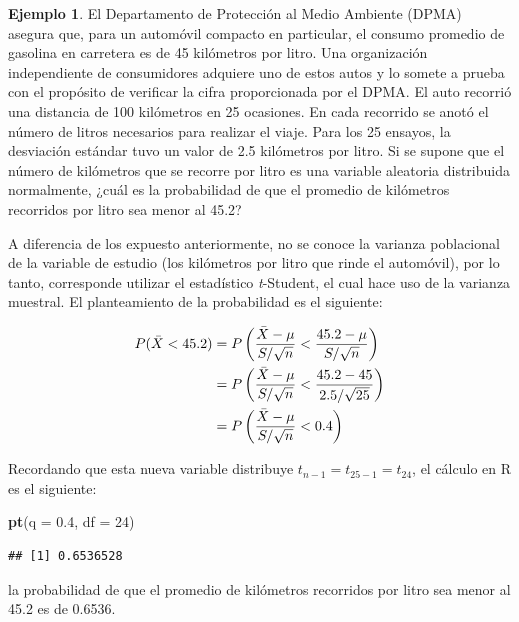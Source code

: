 \documentclass[
  11pt,
]{book}
\newenvironment{Shaded}{\begin{snugshade}}{\end{snugshade}}
\newcommand{\AttributeTok}[1]{\textcolor[rgb]{0.13,0.29,0.53}{#1}}
\newcommand{\DecValTok}[1]{\textcolor[rgb]{0.00,0.00,0.81}{#1}}
\newcommand{\FloatTok}[1]{\textcolor[rgb]{0.00,0.00,0.81}{#1}}
\newcommand{\FunctionTok}[1]{\textcolor[rgb]{0.13,0.29,0.53}{\textbf{#1}}}
\newcommand{\NormalTok}[1]{#1}
\theoremstyle{definition}
\theoremstyle{definition}
\newtheorem{example}{Ejemplo}[chapter]
\theoremstyle{definition}
\theoremstyle{definition}
\theoremstyle{remark}
\begin{document}
\begin{example}
El Departamento de Protección al Medio Ambiente (DPMA) asegura que, para un automóvil compacto en particular, el consumo promedio de gasolina en carretera es de 45 kilómetros por litro. Una organización independiente de consumidores adquiere uno de estos autos y lo somete a prueba con el propósito de verificar la cifra proporcionada por el DPMA. El auto recorrió una distancia de 100 kilómetros en 25 ocasiones. En cada recorrido se anotó el número de litros necesarios para realizar el viaje. Para los 25 ensayos, la desviación estándar tuvo un valor de 2.5 kilómetros por litro. Si se supone que el número de kilómetros que se recorre por litro es una variable aleatoria distribuida normalmente, ¿cuál es la probabilidad de que el promedio de kilómetros recorridos por litro sea menor al 45.2?

A diferencia de los expuesto anteriormente, no se conoce la varianza poblacional de la variable de estudio (los kilómetros por litro que rinde el automóvil), por lo tanto, corresponde utilizar el estadístico \emph{t}-Student, el cual hace uso de la varianza muestral. El planteamiento de la probabilidad es el siguiente:

\begin{equation}
\notag
\begin{split}
P(\bar{X} < 45.2) &= P\left(\frac{\bar{X}-\mu}{S/\sqrt{n}} < \frac{45.2-\mu}{S/\sqrt{n}}\right)\\
&= P\left(\frac{\bar{X}-\mu}{S/\sqrt{n}} < \frac{45.2 - 45}{2.5/\sqrt{25}}\right)\\
&= P\left(\frac{\bar{X}-\mu}{S/\sqrt{n}} < 0.4\right)\\
\end{split}
\end{equation}

Recordando que esta nueva variable distribuye \(t_{n-1}=t_{25-1}=t_{24}\), el cálculo en R es el siguiente:

\begin{Shaded}
\begin{Highlighting}[]
\FunctionTok{pt}\NormalTok{(}\AttributeTok{q =} \FloatTok{0.4}\NormalTok{, }\AttributeTok{df =} \DecValTok{24}\NormalTok{)}
\end{Highlighting}
\end{Shaded}

\begin{verbatim}
## [1] 0.6536528
\end{verbatim}

la probabilidad de que el promedio de kilómetros recorridos por litro sea menor al 45.2 es de 0.6536.
\end{example}
\end{document}
